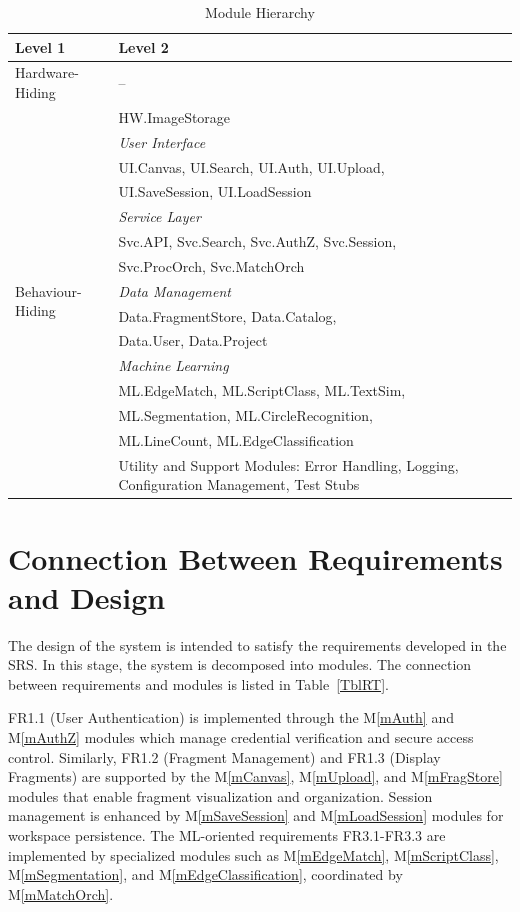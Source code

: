 \documentclass[12pt, titlepage]{article}
\newcommand{\mref}[1]{M\ref{#1}}
\begin{document}
\begin{table}[h!]
\centering
\caption{Module Hierarchy}
\label{TblMH}
\begin{tabularx}{\textwidth}{p{} X}
\toprule
\textbf{Level 1} & \textbf{Level 2}\\
\midrule

Hardware-Hiding & -- \\
\midrule

\multirow{19}{0.3\textwidth}{Behaviour-Hiding}
& HW.ImageStorage \\
\cmidrule{2-2}
& \textit{User Interface}\\
& \quad UI.Canvas, UI.Search, UI.Auth, UI.Upload,\\
& \quad UI.SaveSession, UI.LoadSession\\
\cmidrule{2-2}
& \textit{Service Layer}\\
& \quad Svc.API, Svc.Search, Svc.AuthZ, Svc.Session,\\
& \quad Svc.ProcOrch, Svc.MatchOrch\\
\cmidrule{2-2}
& \textit{Data Management}\\
& \quad Data.FragmentStore, Data.Catalog,\\
& \quad Data.User, Data.Project\\
\cmidrule{2-2}
& \textit{Machine Learning}\\
& \quad ML.EdgeMatch, ML.ScriptClass, ML.TextSim,\\
& \quad ML.Segmentation, ML.CircleRecognition,\\
& \quad ML.LineCount, ML.EdgeClassification\\
\midrule

Software Decision & Utility and Support Modules: Error Handling, Logging, Configuration Management, Test Stubs \\
\bottomrule
\end{tabularx}
\end{table}
\section{Connection Between Requirements and Design} \label{SecConnection}

The design of the system is intended to satisfy the requirements developed in
the SRS. In this stage, the system is decomposed into modules. The connection
between requirements and modules is listed in Table~\ref{TblRT}. \newline

FR1.1 (User Authentication) is implemented through the \mref{mAuth} and \mref{mAuthZ} modules which manage credential verification and secure access control.
Similarly, FR1.2 (Fragment Management) and FR1.3 (Display Fragments) are supported by the \mref{mCanvas}, \mref{mUpload}, and \mref{mFragStore} modules that
enable fragment visualization and organization. Session management is enhanced by \mref{mSaveSession} and \mref{mLoadSession} modules for workspace persistence.
The ML-oriented requirements FR3.1-FR3.3 are implemented by specialized modules such as \mref{mEdgeMatch},
\mref{mScriptClass}, \mref{mSegmentation}, and \mref{mEdgeClassification}, coordinated by \mref{mMatchOrch}.
\end{document}

